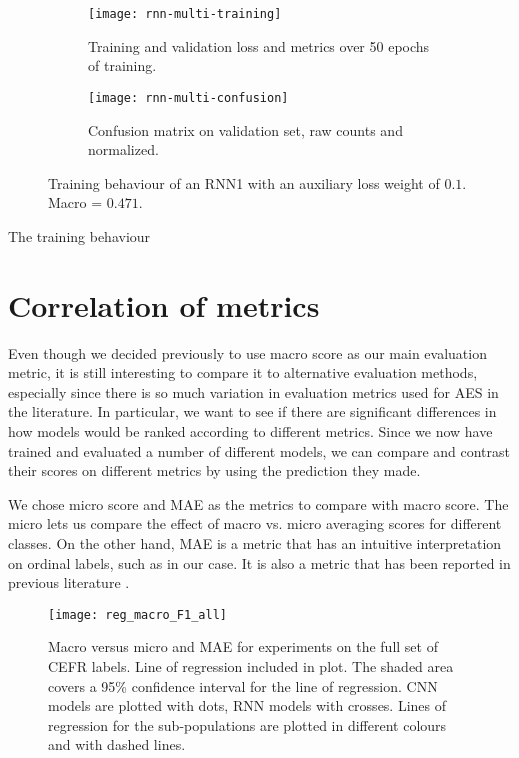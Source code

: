 \begin{figure}
  \begin{subfigure}{\linewidth}
    \centering
    \texttt{[image: rnn-multi-training]}
    \caption{Training and validation loss and metrics over 50 epochs of training.}
  \end{subfigure}
  \begin{subfigure}{\linewidth}
    \centering
    \texttt{[image: rnn-multi-confusion]}
    \caption{Confusion matrix on validation set, raw counts and normalized.}
  \end{subfigure}
  \caption[Training behaviour of a multi-task RNN]{
    Training behaviour of an RNN1 with an auxiliary loss weight of $0.1$.
    Macro \FI = $0.471$.
  }
  \label{fig:rnn-multi-training}
\end{figure}

The training behaviour 


\section{Correlation of metrics}

Even though we decided previously to use macro \FI score as our main
evaluation metric, it is still interesting to compare it to alternative
evaluation methods, especially since there is so much variation in evaluation
metrics used for \ac{AES} in the literature. In particular, we want to see if
there are significant differences in how models would be ranked according to
different metrics. Since we now have trained and evaluated a number of
different models, we can compare and contrast their scores on different
metrics by using the prediction they made.

We chose micro \FI score and \ac{MAE} as the metrics to compare with macro
\FI score. The micro \FI lets us compare the effect of macro vs. micro
averaging scores for different classes. On the other hand, \ac{MAE} is a
metric that has an intuitive interpretation on ordinal labels, such as in our
case. It is also a metric that has been reported in previous literature
\autocite{vajjala17}.

\begin{figure}
  \centering
  \texttt{[image: reg\_macro\_F1\_all]}
  \caption[Macro \FI versus MAE]{
    Macro \FI versus micro \FI and MAE for experiments on the full set of
    CEFR labels. Line of regression included in plot. The shaded area covers
    a 95\% confidence interval for the line of regression. CNN models are
    plotted with dots, RNN models with crosses. Lines of regression for the
    sub-populations are plotted in different colours and with dashed lines.
  }
  \label{fig:reg_macro_F1_all}
\end{figure}

